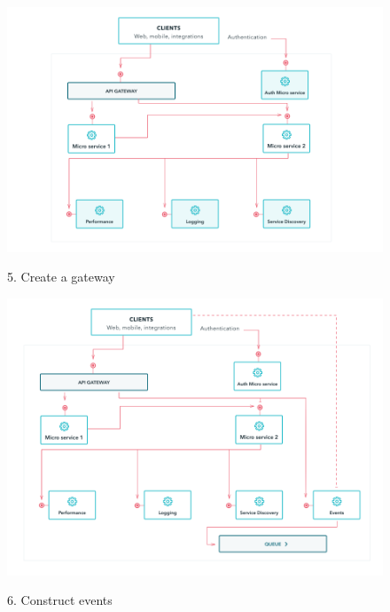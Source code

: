 \documentclass[aspectratio=169]{beamer}
\begin{document}
\begin{frame}
	\begin{figure}
		\caption{5. Create a gateway}
		\includegraphics[height=.8\textheight]{img/5.png}
		\label{img:createAGateway}
	\end{figure}
\end{frame}

\begin{frame}
	\begin{figure}
		\caption{6. Construct events}
		\includegraphics[height=.8\textheight]{img/6.png}
		\label{img:constructEvents}
	\end{figure}
\end{frame}
\end{document}
